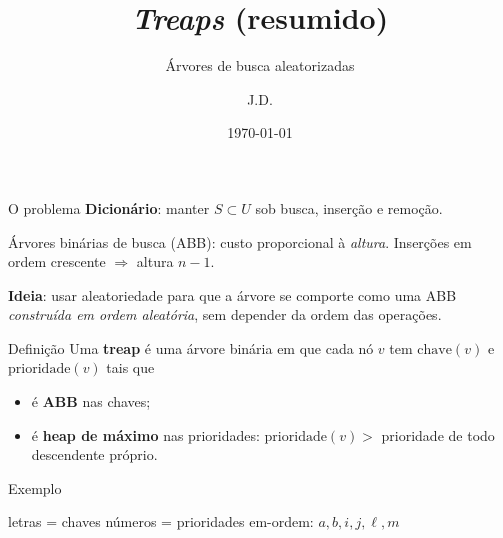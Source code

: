 \documentclass[aspectratio=169,11pt]{beamer}
\title{\textit{Treaps} (resumido)}
\subtitle{Árvores de busca aleatorizadas}
\author{J.D.}
\institute{UFABC}
\date{\today}
\newcommand{\define}[1]{\textbf{#1}}
\theoremstyle{definition}
\begin{document}
\begin{frame}
  \titlepage
\end{frame}

\begin{frame}{O problema}
  \textbf{Dicionário}: manter $S\subset U$ sob busca, inserção e remoção.
  \pause
  \vspace{1ex}

  Árvores binárias de busca (ABB): custo proporcional à \emph{altura}.
  Inserções em ordem crescente $\Rightarrow$ altura $n-1$.
  \pause
  \vspace{1ex}

  \textbf{Ideia}: usar aleatoriedade para que a árvore se comporte como
  uma ABB \emph{construída em ordem aleatória}, sem depender da ordem
  das operações.
\end{frame}

\begin{frame}{Definição}
  Uma \define{treap} é uma árvore binária em que cada nó $v$ tem
  $\mathrm{chave}(v)$ e $\mathrm{prioridade}(v)$ tais que
  \begin{itemize}
  \item é \textbf{ABB} nas chaves;
  \item é \textbf{heap de máximo} nas prioridades:
    $\mathrm{prioridade}(v)>$ prioridade de todo descendente próprio.
  \end{itemize}
  \vspace{1ex}
\end{frame}

\begin{frame}{Exemplo}
  \centering

  \vfill

  \small letras = chaves \quad números = prioridades \quad
  em-ordem: $a,b,i,j,\ell,m$
\end{frame}
\end{document}
